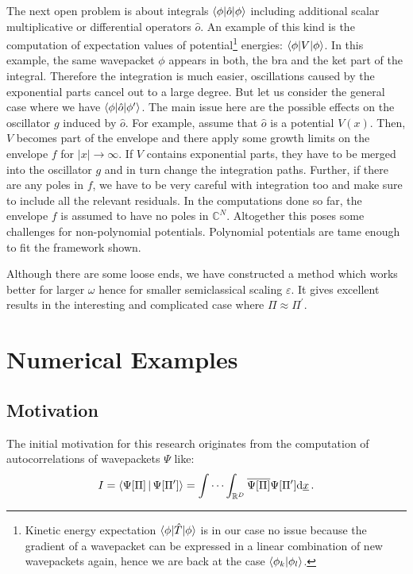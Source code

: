 \documentclass[a4paper,10pt]{article}
\begin{document}
The next open problem is about integrals $\braket{\phi|\hat{o}|\phi}$ including
additional scalar multiplicative or differential operators $\hat{o}$. An example
of this kind is the computation of expectation values of potential\footnote{Kinetic energy
expectation $\braket{\phi|\hat{T}|\phi}$ is in our case no issue because the
gradient of a wavepacket can be expressed in a linear combination of new wavepackets
again, hence we are back at the case $\braket{\phi_k|\phi_l}$.}
energies: $\braket{\phi|V|\phi}$.
In this example, the same wavepacket $\phi$ appears in both, the bra and the
ket part of the integral. Therefore the integration is much easier, oscillations
caused by the exponential parts cancel out to a large degree. But let us consider
the general case where we have $\braket{\phi|\hat{o}|\phi^\prime}$. The main issue
here are the possible effects on the oscillator $g$ induced by $\hat{o}$. For example,
assume that $\hat{o}$ is a potential $V(x)$. Then, $V$ becomes part of the envelope
and there apply some growth limits on the envelope $f$ for $|x| \rightarrow \infty$.
If $V$ contains exponential parts, they have to be merged into the oscillator $g$ and
in turn change the integration paths. Further, if there are any poles
in $f$, we have to be very careful with integration too and make sure to include all
the relevant residuals. In the computations done so far, the envelope $f$ is assumed
to have no poles in $\mathbb{C}^{N}$. Altogether this poses some challenges for
non-polynomial potentials. Polynomial potentials are tame enough to
fit the framework shown.

Although there are some loose ends, we have constructed a method which works better
for larger $\omega$ hence for smaller semiclassical scaling $\varepsilon$.
It gives excellent results in the interesting and complicated case where
$\Pi \approx \Pi^{\prime}$.


\section{Numerical Examples}

\subsection{Motivation}


The initial motivation for this research originates from the computation of autocorrelations
of wavepackets $\Psi$ like:
\begin{equation}\label{eq:compute_ac_wavepackets}
  I = \Braket{\Psi[\Pi] | \Psi[\Pi^{\prime}]}
    = \idotsint_{\mathbb{R}^{D}} \overline{\Psi[\Pi]} \Psi[\Pi^{\prime}] \mathrm{d}\underline{x} \,.
\end{equation}
\end{document}
